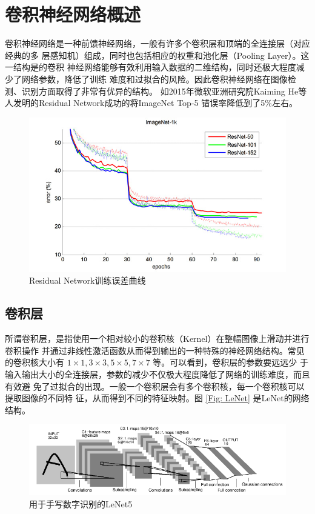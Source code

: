 \section{卷积神经网络概述}

卷积神经网络是一种前馈神经网络，一般有许多个卷积层和顶端的全连接层（对应经典的多
层感知机）组成，同时也包括相应的权重和池化层（Pooling Layer）。这一结构是的卷积
神经网络能够有效利用输入数据的二维结构，同时还极大程度减少了网络参数，降低了训练
难度和过拟合的风险。因此卷积神经网络在图像检测、识别方面取得了非常有优异的结构。
如2015年微软亚洲研究院Kaiming He等人发明的Residual Network成功的将ImageNet Top-5
错误率降低到了5\%左右\cite{He:2015tt}\cite{He:2016tq}。

\begin{figure}[ht]
  \centering
  \includegraphics[width=0.8/linewidth]{./Figure/ResNetTrainError.jpg}
  \caption{Residual Network训练误差曲线\cite{He:2015tt}}
\end{figure}

\subsection{卷积层}

所谓卷积层，是指使用一个相对较小的卷积核（Kernel）在整幅图像上滑动并进行卷积操作
并通过非线性激活函数从而得到输出的一种特殊的神经网络结构。常见的卷积核大小有 $1
\times 1, 3 \times 3, 5 \times 5, 7 \times 7$ 等。可以看到，卷积层的参数要远远少
于输入输出大小的全连接层，参数的减少不仅极大程度降低了网络的训练难度，而且有效避
免了过拟合的出现。一般一个卷积层会有多个卷积核，每一个卷积核可以提取图像的不同特
征，从而得到不同的特征映射。图 \ref{Fig: LeNet} 是LeNet\cite{LeCun:1990vp}的网络
结构。

\begin{figure}[ht]
  \centering
  \includegraphics[width=0.8/linewidth]{./Figure/LeNet.png}
  \caption{用于手写数字识别的LeNet5\cite{LeCun:1990vp}} \label{Fig:LeNet}
\end{figure}


